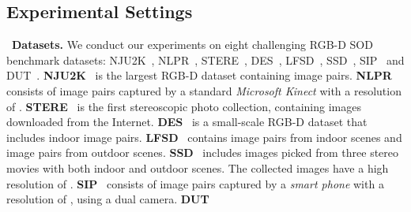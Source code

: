 \documentclass[journal]{IEEEtran}
\newcommand{\myPara}[1]{\vspace{10pt}\noindent~\textbf{#1} \quad}
\begin{document}
\subsection{Experimental Settings}\label{sec:experimental_settings}


\myPara{\textbf{Datasets.}}\label{sec:dataset}
We conduct our experiments on eight challenging RGB-D SOD benchmark datasets:
NJU2K~\cite{ju2014ACSD}, NLPR~\cite{peng2014LHM}, STERE~\cite{niu2012STERE}, DES~\cite{cheng2014DESM}, LFSD~\cite{li2014LFSD}, SSD~\cite{zhu2017SSD},
SIP~\cite{fan2019D3Net} and DUT~\cite{piao2019DMRA}.
\textbf{NJU2K}~\cite{ju2014ACSD} is the largest RGB-D dataset containing  image pairs. \textbf{NLPR}~\cite{peng2014LHM} consists of  image pairs captured by a standard \textit{Microsoft Kinect} with a resolution of . \textbf{STERE}~\cite{niu2012STERE} is the first stereoscopic photo collection, containing  images downloaded from the Internet. \textbf{DES}~\cite{cheng2014DESM} is a small-scale RGB-D dataset that includes  indoor image pairs. \textbf{LFSD}~\cite{li2014LFSD} contains  image pairs from indoor scenes and  image pairs from outdoor scenes. \textbf{SSD}~\cite{zhu2017SSD} includes  images picked from three stereo
movies with both indoor and outdoor scenes. The collected images have a high resolution of .
\textbf{SIP}~\cite{fan2019D3Net} consists of  image pairs captured by a \textit{smart phone} with a resolution of , using a dual camera. \textbf{DUT}~\cite{piao2019DMRA} 
\end{document}
